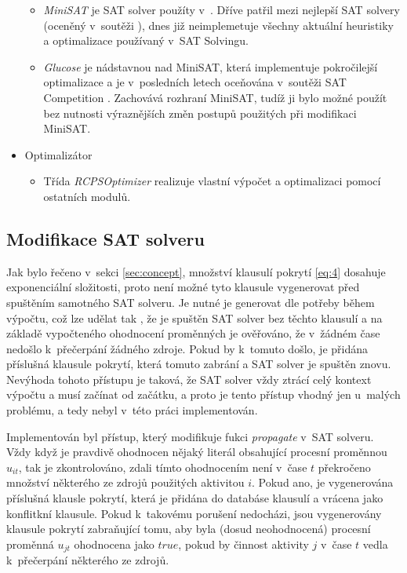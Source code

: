 \documentclass[a4paper, 12pt]{article}
\begin{document}
\begin{itemize}
    \begin{itemize}
        \item \emph{MiniSAT} \cite{www:minisat} je SAT solver použíty v~\cite{horbach:10}.
        Dříve patřil mezi nejlepší SAT solvery (oceněný v~soutěži \cite{www:sat}), dnes již neimplemetuje
        všechny aktuální heuristiky a optimalizace používaný v~SAT Solvingu.
        \item \emph{Glucose} \cite{www:glucose} je nádstavnou nad MiniSAT, která implementuje
        pokročilejší optimalizace a je v~posledních letech oceňována v~soutěži SAT Competition \cite{www:sat}.
        Zachovává rozhraní MiniSAT, tudíž ji bylo možné použít bez nutnosti výraznějších změn postupů použitých při
        modifikaci MiniSAT.
    \end{itemize}
 \item Optimalizátor
    \begin{itemize}
        \item Třída \emph{RCPSOptimizer} realizuje vlastní výpočet a optimalizaci pomocí ostatních modulů.
    \end{itemize}
\end{itemize}

\subsection{Modifikace SAT solveru}
Jak bylo řečeno v~sekci \ref{sec:concept}, množství klausulí pokrytí \ref{eq:4} dosahuje exponenciální složitosti,
proto není možné tyto klausule vygenerovat před spuštěním samotného SAT solveru.
Je nutné je generovat dle potřeby během výpočtu, což lze udělat tak \cite{horbach:10}, že je spuštěn SAT solver bez
těchto klausulí a na základě vypočteného ohodnocení proměnných je ověřováno, že v~žádném čase
nedošlo k~přečerpání žádného zdroje.
Pokud by k~tomuto došlo, je přidána příslušná klausule pokrytí, která tomuto zabrání a SAT solver je spuštěn
znovu.
Nevýhoda tohoto přístupu je taková, že SAT solver vždy ztrácí celý kontext výpočtu a musí začínat od začátku, a proto
je tento přístup vhodný jen u~malých problému, a tedy nebyl v~této práci implementován.

Implementován byl přístup, který modifikuje fukci \emph{propagate} v~SAT solveru.
Vždy když je pravdivě ohodnocen nějaký literál obsahující procesní proměnnou $u_{it}$, tak je zkontrolováno,
zdali tímto ohodnocením není v~čase $t$ překročeno množství některého ze zdrojů použitých aktivitou $i$.
Pokud ano, je vygenerována příslušná klausle pokrytí, která je přidána do databáse klausulí a vrácena jako konflitkní klausule.
Pokud k~takovému porušení nedocházi, jsou vygenerovány klausule pokrytí zabraňující tomu, aby byla 
(dosud neohodnocená) procesní proměnná $u_{jt}$ ohodnocena jako $true$,
pokud by činnost aktivity $j$ v~čase $t$ vedla k~přečerpání některého ze zdrojů.
\end{document}
